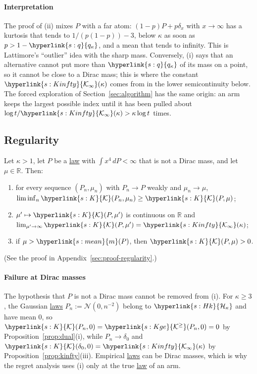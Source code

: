 \documentclass[11pt]{article}
\newcommand{\R}{\mathbb{R}}
\newcommand{\sy}[2]{{\hyperlink{#1}{#2}}}
\newcommand{\term}[2]{\hyperlink{#1}{#2}}
\newcommand{\mean}{\sy{s:mean}{m}}
\newcommand{\Hk}{\sy{s:Hk}{\mathcal{H}_{\kappa}}}
\newcommand{\Kc}{\sy{s:K}{\mathcal{K}}}
\newcommand{\Kge}{\sy{s:Kge}{\mathcal{K}^{\ge}}}
\newcommand{\qk}{\sy{s:q}{q_{\kappa}}}
\newcommand{\Kinfty}{\sy{s:Kinfty}{\mathcal{K}_{\infty}}}
\begin{document}
\paragraph{Interpretation} The proof of (ii) mixes $P$ with a far atom: $(1-p)P+p\delta_x$ with $x\to\infty$ has
a kurtosis that tends to $1/(p(1-p))-3$, below $\kappa$ as soon as $p>1-\qk$, and a mean that tends to
infinity. This is Lattimore's ``outlier'' idea with the sharp mass. Conversely, (i) says that an
alternative cannot put more than $\qk$ of its mass on a point, so it cannot be close to a Dirac mass; this
is where the constant $\Kinfty(\kappa)$ comes from in the lower semicontinuity below. The forced
exploration of Section~\ref{sec:algorithm} has the same origin: an arm keeps the largest possible index until it has
been pulled about $\log t/\Kinfty(\kappa)>\kappa\log t$ times.

\subsection{Regularity}

\begin{proposition}\label{prop:regularity}
Let $\kappa>1$, let $P$ be a \term{w:law}{law} with $\int x^4\,dP<\infty$ that is not a Dirac mass, and let $\mu\in\R$. Then:
\begin{enumerate}[label=(\roman*)]
  \item for every sequence $(P_n,\mu_n)$ with $P_n\to P$ weakly and $\mu_n\to\mu$,
  $\liminf_n\Kc(P_n,\mu_n)\ge\Kc(P,\mu)$;
  \item $\mu'\mapsto\Kc(P,\mu')$ is continuous on $\R$ and $\lim_{\mu'\to\infty}\Kc(P,\mu')=\Kinfty(\kappa)$;
  \item if $\mu>\mean(P)$, then $\Kc(P,\mu)>0$.
\end{enumerate}
\end{proposition}

(See the proof in Appendix~\ref{sec:proof-regularity}.)

\paragraph{Failure at Dirac masses} The hypothesis that $P$ is not a Dirac mass cannot be removed from (i).
For $\kappa\ge3$, the Gaussian \term{w:law}{laws} $P_n:=\mathcal N(0,n^{-2})$ belong to $\Hk$ and have mean $0$, so
$\Kc(P_n,0)=\Kge(P_n,0)=0$ by Proposition~\ref{prop:dual}(i), while $P_n\to\delta_0$ and $\Kc(\delta_0,0)=\Kinfty(\kappa)$ by
Proposition~\ref{prop:kinfty}(iii). Empirical \term{w:law}{laws} can be Dirac masses, which is why the regret analysis
uses (i) only at the true \term{w:law}{law} of an arm.
\end{document}
